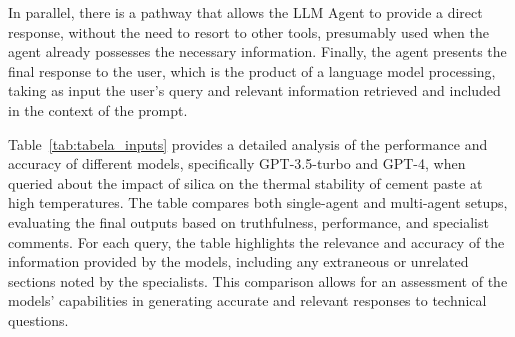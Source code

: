             In parallel, there is a pathway that allows the LLM Agent to provide a direct response, without the need to resort to other tools, presumably used when the agent already possesses the necessary information. 
            Finally, the agent presents the final response to the user, which is the product of a language model processing, taking as input the user's query and relevant information retrieved and included in the context of the prompt.

             Table~\ref{tab:tabela_inputs} provides a detailed analysis of the performance and accuracy of different models, specifically GPT-3.5-turbo and GPT-4, when queried about the impact of silica on the thermal stability of cement paste at high temperatures. 
             The table compares both single-agent and multi-agent setups, evaluating the final outputs based on truthfulness, performance, and specialist comments. 
             For each query, the table highlights the relevance and accuracy of the information provided by the models, including any extraneous or unrelated sections noted by the specialists. 
             This  comparison allows for an  assessment of the models' capabilities in generating accurate and relevant responses to technical questions.

